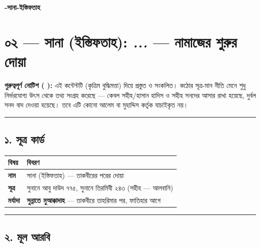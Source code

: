 

\begin{center}{\Large\bfseries\color{emerald} -সানা-ইস্তিফতাহ}\end{center}
\vspace{1em}
\section*{০২ — সানা (ইস্তিফতাহ): \textit{ ...} — নামাজের শুরুর দোয়া}

\begin{warnbox}
 \textbf{গুরুত্বপূর্ণ নোটিশ ( ):} এই কন্টেন্টটি  (কৃত্রিম বুদ্ধিমত্তা) দিয়ে প্রস্তুত ও সংকলিত।  কঠোর সূত্র-মান নীতি মেনে শুধু নির্ভরযোগ্য উৎস থেকে তথ্য সংগ্রহ করেছে — কেবল সহীহ/হাসান হাদিস ও সহীহ সনদের আসার রাখা হয়েছে, দুর্বল সনদ বাদ দেওয়া হয়েছে। তবে এটি কোনো আলেম বা মুহাদ্দিস কর্তৃক যাচাইকৃত নয়।
\end{warnbox}

\medskip\hrule\medskip

\subsection*{১. সূত্র কার্ড}

\begin{table}[h]\centering\small
\begin{tabular}{ll}
বিষয় & বিবরণ \\
\hline
\textbf{নাম} & সানা (ইস্তিফতাহ) — তাকবীরের পরের দোয়া \\
\textbf{সূত্র} & সুনানে আবু দাউদ ৭৭৫, সুনানে তিরমিযী ২৪৩ (সহীহ — আলবানি) \\
\textbf{মর্যাদা} & \textbf{সুন্নাতে মুআক্কাদাহ} — তাকবীরে তাহরিমার পর, ফাতিহার আগে \\
\hline
\end{tabular}
\end{table}

\medskip\hrule\medskip

\subsection*{২. মূল আরবি}

\begin{center}\end{center}

